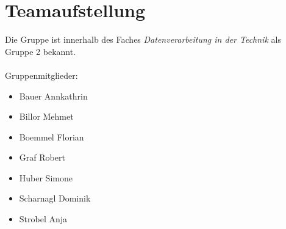 \section{Teamaufstellung}

Die Gruppe ist innerhalb des Faches \textit{Datenverarbeitung in der Technik} als Gruppe 2 bekannt.\\
\\
Gruppenmitglieder:
\begin{itemize}
\item Bauer Annkathrin
\item Billor Mehmet
\item Boemmel Florian
\item Graf Robert
\item Huber Simone
\item Scharnagl Dominik
\item Strobel Anja
\end{itemize}
